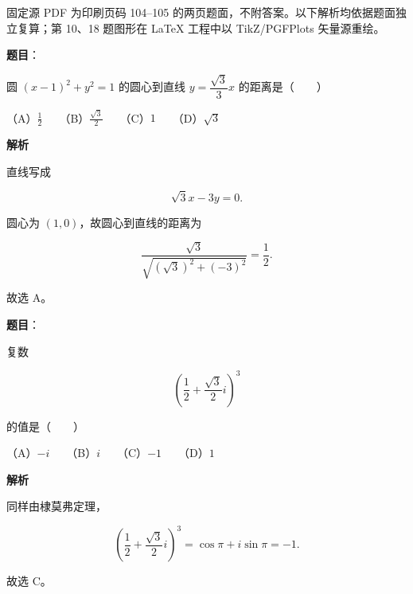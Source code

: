

\begin{gktip}
固定源 PDF 为印刷页码 104–105 的两页题面，不附答案。以下解析均依据题面独立复算；第 10、18 题图形在 LaTeX 工程中以 TikZ/PGFPlots 矢量源重绘。
\end{gktip}


\begin{answer}

\textbf{题目}：

圆 $(x-1)^2+y^2=1$ 的圆心到直线 $y=\dfrac{\sqrt3}{3}x$ 的距离是\mbox{（　　）}

（A）$\frac12$　　（B）$\frac{\sqrt3}{2}$　　（C）$1$　　（D）$\sqrt3$

\textbf{解析}

直线写成

\nopagebreak[4]
\[
\sqrt3x-3y=0.
\]

圆心为 $(1,0)$，故圆心到直线的距离为

\nopagebreak[4]
\[
\frac{\sqrt3}{\sqrt{(\sqrt3)^2+(-3)^2}}
=\frac12.
\]

故选 A。


\end{answer}
\begin{answer}

\textbf{题目}：

复数

\nopagebreak[4]
\[
\left(\frac12+\frac{\sqrt3}{2}i\right)^3
\]

的值是\mbox{（　　）}

（A）$-i$　　（B）$i$　　（C）$-1$　　（D）$1$

\textbf{解析}

同样由棣莫弗定理，

\nopagebreak[4]
\[
\left(\frac12+\frac{\sqrt3}{2}i\right)^3
=\cos\pi+i\sin\pi=-1.
\]

故选 C。


\end{answer}
